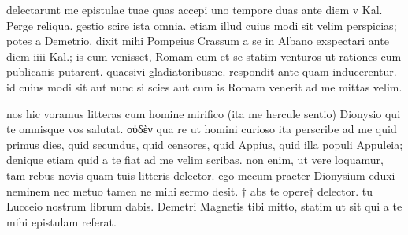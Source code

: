 


 delectarunt me epistulae tuae quas accepi uno tempore duas ante diem v Kal. Perge reliqua. gestio scire ista omnia. etiam illud cuius modi sit velim perspicias; potes a Demetrio. dixit mihi Pompeius Crassum a se in Albano exspectari ante diem iiii Kal.; is cum venisset, Romam eum et se statim venturos ut rationes cum publicanis putarent. quaesivi gladiatoribusne. respondit ante quam inducerentur. id cuius modi sit aut nunc si scies aut cum is Romam venerit ad me mittas velim.

 nos hic voramus litteras cum homine mirifico (ita me hercule sentio) Dionysio qui te omnisque vos salutat. οὐδὲν qua re ut homini curioso ita perscribe ad me quid primus dies, quid secundus, quid censores, quid Appius, quid illa populi Appuleia; denique etiam quid a te fiat ad me velim scribas. non enim, ut vere loquamur, tam rebus novis quam tuis litteris delector. ego mecum praeter Dionysium eduxi neminem nec metuo tamen ne mihi sermo desit. † abs te opere† delector. tu Lucceio nostrum librum dabis. Demetri Magnetis tibi mitto, statim ut sit qui a te mihi epistulam referat.
